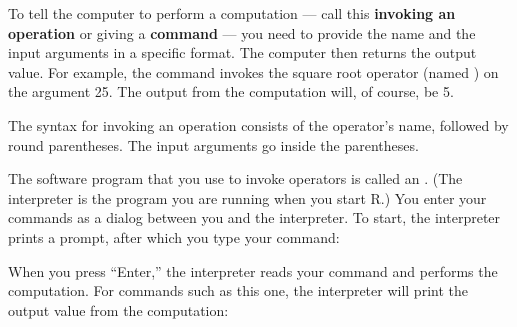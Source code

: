 To tell the computer to perform a computation --- call this
{\bf invoking an operation} or giving a {\bf command} --- 
you need to provide the
name and the input arguments in a specific format. The computer then
returns the output value.  For example, the command 
invokes the square root operator (named ) on the argument
25.  The output from the computation will, of course, be 5.

The syntax 
for invoking an operation consists of the operator's name,
followed by round parentheses.  The input arguments go inside the
parentheses.

The software program that you use to invoke operators is called an
.  (The interpreter is the program you are
running when you start R.)  You enter your commands as a dialog
between you and the interpreter.  To start, the interpreter prints a
prompt, after which you type your command:


\noindent{}

When you press ``Enter,'' the interpreter reads your command and performs
the computation.  For commands such as this one, the interpreter
will print the output value from the computation:

\noindent{}

